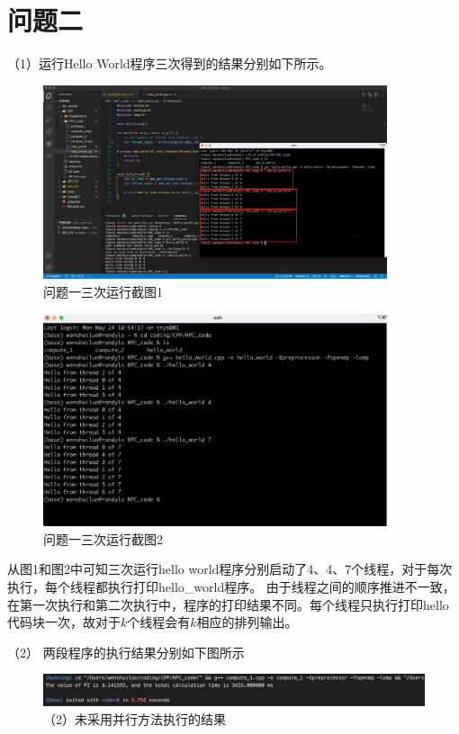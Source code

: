 \documentclass[12pt]{article}
\begin{document}
\section{问题二}
		（1）运行Hello World程序三次得到的结果分别如下所示。
		\begin{figure}[htbp]
			\centering
			\includegraphics[width=0.9\textwidth]{hello_world三次运行.png}
			\caption{问题一三次运行截图1}
			\label{fig:pro2_1_1}
		\end{figure}
		\begin{figure}[htbp]
			\centering
			\includegraphics[width=0.9\textwidth]{pro1.png}
			\caption{问题一三次运行截图2}
			\label{fig:pro2_1_2}
		\end{figure}

		从图1和图2中可知三次运行hello world程序分别启动了4、4、7个线程，对于每次执行，每个线程都执行打印hello\_world程序。
		由于线程之间的顺序推进不一致，在第一次执行和第二次执行中，程序的打印结果不同。每个线程只执行打印hello代码块一次，故对于$k$个线程会有$k$相应的排列输出。		

		（2） 两段程序的执行结果分别如下图所示
		\begin{figure}[htbp]
			\centering
			\includegraphics[width=1.0\textwidth]{result4.png}
			\caption{（2）未采用并行方法执行的结果}
		\end{figure}
		
\end{document}
